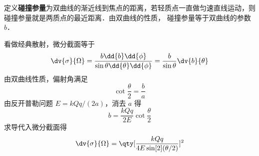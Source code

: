 

定义\textbf{碰撞参量}为双曲线的渐近线到焦点的距离，若轻质点一直做匀速直线运动，则碰撞参量就是两质点的最近距离．由双曲线的性质，%
碰撞参量等于双曲线的参数 $b$．

看做经典散射，微分截面等于
\begin{equation}
\dv{\sigma}{\Omega} = \frac{b \dd{b}\dd{\phi} }{\sin \theta \dd{\theta} \dd{\phi} } = \frac{b}{\sin \theta }\dv{b}{\theta}
\end{equation}
由双曲线性质，偏射角满足
\begin{equation}
\cot{\frac{\theta }{2}}= \frac{b}{a}
\end{equation}
由反开普勒问题  $E = kQq/(2a)$，消去 $a$ 得
\begin{equation}
b = \frac{kQq}{2E}\cot {\frac{\theta }{2}}
\end{equation}
求导代入微分截面得
\begin{equation}
\dv{\sigma}{\Omega} = \qty[ \frac{kQq}{4E \sin[2](\theta /2)} ]^2
\end{equation}
